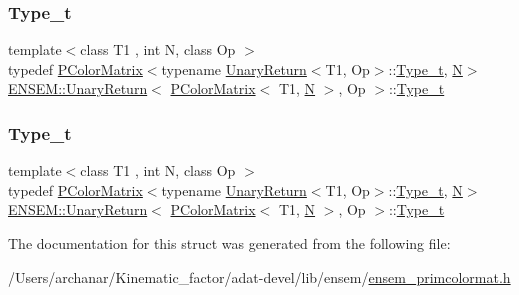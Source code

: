 \subsubsection{\texorpdfstring{Type\_t}{Type\_t}\hspace{0.1cm}{\footnotesize\ttfamily [2/3]}}
{\footnotesize\ttfamily template$<$class T1 , int N, class Op $>$ \\
typedef \mbox{\hyperlink{classENSEM_1_1PColorMatrix}{P\+Color\+Matrix}}$<$typename \mbox{\hyperlink{structENSEM_1_1UnaryReturn}{Unary\+Return}}$<$T1, Op$>$\+::\mbox{\hyperlink{structENSEM_1_1UnaryReturn_3_01PColorMatrix_3_01T1_00_01N_01_4_00_01Op_01_4_a2b137e72bb2c6ed25df4d747fd568a79}{Type\+\_\+t}}, \mbox{\hyperlink{adat__devel_2lib_2hadron_2operator__name__util_8cc_a7722c8ecbb62d99aee7ce68b1752f337}{N}}$>$ \mbox{\hyperlink{structENSEM_1_1UnaryReturn}{E\+N\+S\+E\+M\+::\+Unary\+Return}}$<$ \mbox{\hyperlink{classENSEM_1_1PColorMatrix}{P\+Color\+Matrix}}$<$ T1, \mbox{\hyperlink{adat__devel_2lib_2hadron_2operator__name__util_8cc_a7722c8ecbb62d99aee7ce68b1752f337}{N}} $>$, Op $>$\+::\mbox{\hyperlink{structENSEM_1_1UnaryReturn_3_01PColorMatrix_3_01T1_00_01N_01_4_00_01Op_01_4_a2b137e72bb2c6ed25df4d747fd568a79}{Type\+\_\+t}}}

\mbox{\label{structENSEM_1_1UnaryReturn_3_01PColorMatrix_3_01T1_00_01N_01_4_00_01Op_01_4_a2b137e72bb2c6ed25df4d747fd568a79}} 
\subsubsection{\texorpdfstring{Type\_t}{Type\_t}\hspace{0.1cm}{\footnotesize\ttfamily [3/3]}}
{\footnotesize\ttfamily template$<$class T1 , int N, class Op $>$ \\
typedef \mbox{\hyperlink{classENSEM_1_1PColorMatrix}{P\+Color\+Matrix}}$<$typename \mbox{\hyperlink{structENSEM_1_1UnaryReturn}{Unary\+Return}}$<$T1, Op$>$\+::\mbox{\hyperlink{structENSEM_1_1UnaryReturn_3_01PColorMatrix_3_01T1_00_01N_01_4_00_01Op_01_4_a2b137e72bb2c6ed25df4d747fd568a79}{Type\+\_\+t}}, \mbox{\hyperlink{adat__devel_2lib_2hadron_2operator__name__util_8cc_a7722c8ecbb62d99aee7ce68b1752f337}{N}}$>$ \mbox{\hyperlink{structENSEM_1_1UnaryReturn}{E\+N\+S\+E\+M\+::\+Unary\+Return}}$<$ \mbox{\hyperlink{classENSEM_1_1PColorMatrix}{P\+Color\+Matrix}}$<$ T1, \mbox{\hyperlink{adat__devel_2lib_2hadron_2operator__name__util_8cc_a7722c8ecbb62d99aee7ce68b1752f337}{N}} $>$, Op $>$\+::\mbox{\hyperlink{structENSEM_1_1UnaryReturn_3_01PColorMatrix_3_01T1_00_01N_01_4_00_01Op_01_4_a2b137e72bb2c6ed25df4d747fd568a79}{Type\+\_\+t}}}



The documentation for this struct was generated from the following file\+:\begin{DoxyCompactItemize}
\item 
/\+Users/archanar/\+Kinematic\+\_\+factor/adat-\/devel/lib/ensem/\mbox{\hyperlink{adat-devel_2lib_2ensem_2ensem__primcolormat_8h}{ensem\+\_\+primcolormat.\+h}}\end{DoxyCompactItemize}
